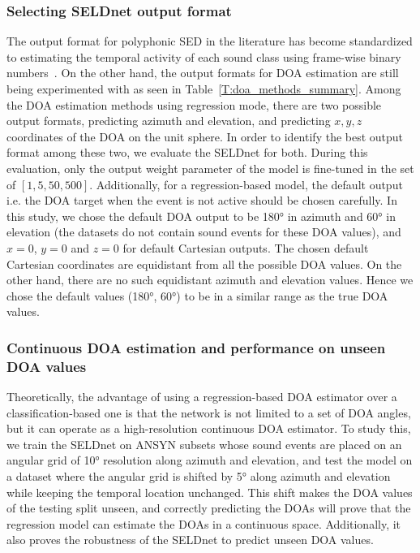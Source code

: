 \documentclass[journal]{IEEEtran}
\begin{document}
\subsubsection{Selecting SELDnet output format}
The output format for polyphonic SED in the literature has become standardized to estimating the temporal activity of each sound class using frame-wise binary numbers~\cite{Hayashi_TASLP2017,Zohrer_INTERSPEECH2017,Zhang2015,Phan2016}. On the other hand, the output formats for DOA estimation are still being experimented with as seen in Table~\ref{T:doa_methods_summary}. Among the DOA estimation methods using regression mode, there are two possible output formats, predicting azimuth and elevation, and predicting $x,y,z$ coordinates of the DOA on the unit sphere. In order to identify the best output format among these two, we evaluate the SELDnet for both. During this evaluation, only the output weight parameter of the model is fine-tuned in the set of $[1, 5, 50, 500]$. Additionally, for a regression-based model, the default output i.e. the DOA target when the event is not active should be chosen carefully. In this study, we chose the default DOA output to be \ang{180} in azimuth and \ang{60} in elevation (the datasets do not contain sound events for these DOA values), and $x=0$, $y=0$ and $z=0$ for default Cartesian outputs. The chosen default Cartesian coordinates are equidistant from all the possible DOA values. On the other hand, there are no such equidistant azimuth and elevation values. Hence we chose the default values (\ang{180}, \ang{60}) to be in a similar range as the true DOA values.


\subsubsection{Continuous DOA estimation and performance on unseen DOA values} \label{sssec:cont_doa}
Theoretically, the advantage of using a regression-based DOA estimator over a classification-based one is that the network is not limited to a set of DOA angles, but it can operate as a high-resolution continuous DOA estimator. To study this, we train the SELDnet on ANSYN subsets whose sound events are placed on an angular grid of \ang{10} resolution along azimuth and elevation, and test the model on a dataset where the angular grid is shifted by \ang{5} along azimuth and elevation while keeping the temporal location unchanged. This shift makes the DOA values of the testing split unseen, and correctly predicting the DOAs will prove that the regression model can estimate the DOAs in a continuous space. Additionally, it also proves the robustness of the SELDnet to predict unseen DOA values.
\end{document}
